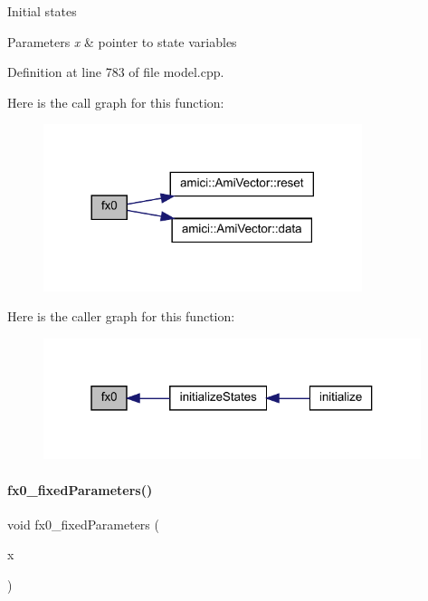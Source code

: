 Initial states 
\begin{DoxyParams}{Parameters}
{\em x} & pointer to state variables \\
\hline
\end{DoxyParams}


Definition at line 783 of file model.\+cpp.

Here is the call graph for this function\+:
\nopagebreak
\begin{figure}[H]
\begin{center}
\leavevmode
\includegraphics[width=264pt]{classamici_1_1_model_aa9a9e12a414d9ac91249b63d01ab7bca_cgraph}
\end{center}
\end{figure}
Here is the caller graph for this function\+:
\nopagebreak
\begin{figure}[H]
\begin{center}
\leavevmode
\includegraphics[width=313pt]{classamici_1_1_model_aa9a9e12a414d9ac91249b63d01ab7bca_icgraph}
\end{center}
\end{figure}
\mbox{\label{classamici_1_1_model_ae517574d2a7c504c388438a08a1aed38}} 
\paragraph{\texorpdfstring{fx0\+\_\+fixed\+Parameters()}{fx0\_fixedParameters()}\hspace{0.1cm}{\footnotesize\ttfamily [1/2]}}
{\footnotesize\ttfamily void fx0\+\_\+fixed\+Parameters (\begin{DoxyParamCaption}\item[{\mbox{\hyperlink{classamici_1_1_ami_vector}{Ami\+Vector}} $\ast$}]{x }\end{DoxyParamCaption})}

